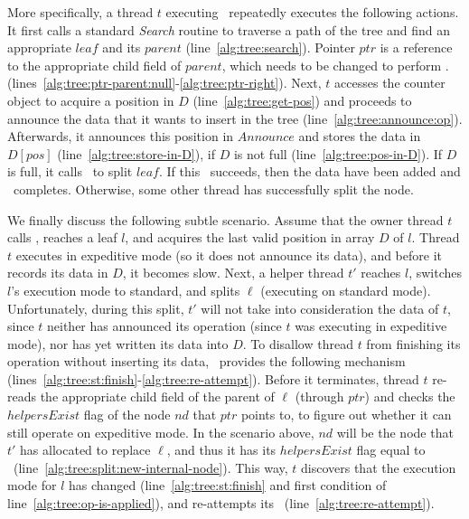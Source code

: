     More specifically, a thread $t$ executing \TreeInsert\ repeatedly executes the following actions. 
    It first calls a standard \textit{Search} routine to traverse a path of the tree and find an appropriate
    $\mathit{leaf}$ and its $\mathit{parent}$ (line~\ref{alg:tree:search}).
    Pointer $\mathit{ptr}$ is a reference to the appropriate child field of $\mathit{parent}$,
    which needs to be changed to perform \TreeInsert.  (lines~\ref{alg:tree:ptr-parent:null}-\ref{alg:tree:ptr-right}).
    Next, $t$ accesses the counter object to acquire a position in $D$ (line~\ref{alg:tree:get-pos})
    and proceeds to announce the data that it wants to insert in the tree (line~\ref{alg:tree:announce:op}).
    Afterwards, it announces this position in $\mathit{Announce}$ and stores the data in $D[\mathit{pos}]$
    (line~\ref{alg:tree:store-in-D}), if $D$ is not full (line~\ref{alg:tree:pos-in-D}). 
    If $D$ is full, it calls \SplitLeaf\ to split $\mathit{leaf}$.
    If this \CAS\ succeeds, then the data have been added and \TreeInsert\ completes. 
    Otherwise, some other thread has successfully split the node.
    
    We finally discuss the following subtle scenario. Assume that the owner thread $t$ calls \TreeInsert,
    reaches a leaf $\mathit{l}$, and acquires the last valid position in array $D$ of $\mathit{l}$. 
    Thread $t$ executes in expeditive mode (so it does not announce its data),
    and before it records its data in $D$, it becomes slow. Next, a helper thread $t'$ reaches $\mathit{l}$, switches 
    $\mathit{l}$'s execution mode to standard, and splits $\ell$ (executing on standard mode). 
    Unfortunately, during this split, $t'$ will not take into 
    consideration the data of $t$, since $t$ neither has announced its operation
    (since $t$ was executing in expeditive mode), nor has yet written its data into $D$. 
    To disallow thread $t$ from finishing its operation without inserting its data, \TreeInsert\ provides the 
    following mechanism (lines~\ref{alg:tree:st:finish}-\ref{alg:tree:re-attempt}). Before it terminates, 
    thread $t$ re-reads the appropriate child field of the parent of $\ell$ (through $\mathit{ptr}$) 
    and checks the $\mathit{helpersExist}$ flag of the node $nd$ that $\mathit{ptr}$ points to,
    to figure out whether it can still operate on expeditive mode. In the scenario above, 
    $nd$ will be the node that $t'$ has allocated to replace $\ell$, and thus it has its 
    $\mathit{helpersExist}$ flag equal to \True\ (line~\ref{alg:tree:split:new-internal-node}). 
    This way, $t$ discovers that the execution mode for $\mathit{l}$ has changed
    (line~\ref{alg:tree:st:finish} and first condition of line~\ref{alg:tree:op-is-applied}),
    and re-attempts its \Insert\ (line~\ref{alg:tree:re-attempt}).
        
